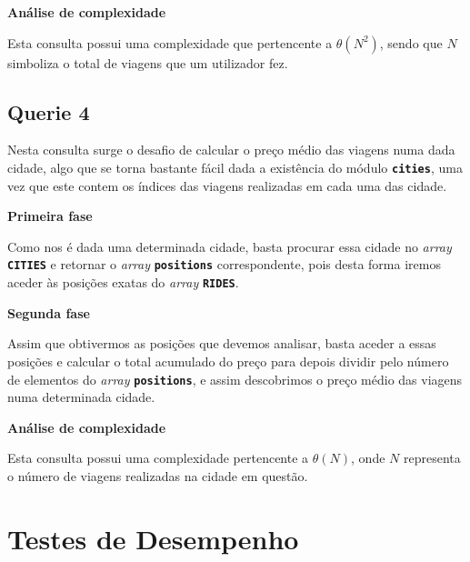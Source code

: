 \documentclass[12pt,a4paper]{report}
\begin{document}
\normalsize\textbf{Análise de complexidade }{\titlerule[0.5pt]}

Esta consulta possui uma complexidade que pertencente a \(\theta(N^2)\), sendo que \(N\) simboliza o total de viagens que um utilizador fez. 


\section{Querie 4}

Nesta consulta surge o desafio de calcular o preço médio das viagens numa dada cidade, algo que se torna bastante fácil dada a existência do módulo \textbf{\small\texttt{cities}}, uma vez que este contem os índices das viagens realizadas em cada uma das cidade.

\normalsize\textbf{Primeira fase }{\titlerule[0.5pt]}

Como nos é dada uma determinada cidade, basta procurar essa cidade no \textit{array} \textbf{\small\texttt{CITIES}} e retornar o \textit{array} \textbf{\small\texttt{positions}} correspondente, pois desta forma iremos aceder às posições exatas do \textit{array} \textbf{\small\texttt{RIDES}}.

\normalsize\textbf{Segunda fase }{\titlerule[0.5pt]}

Assim que obtivermos as posições que devemos analisar, basta aceder a essas posições e calcular o total acumulado do preço para depois dividir pelo número de elementos do \textit{array} \textbf{\small\texttt{positions}}, e assim descobrimos o preço médio das viagens numa determinada cidade.

\normalsize\textbf{Análise de complexidade }{\titlerule[0.5pt]}

Esta consulta possui uma complexidade pertencente a \(\theta(N)\), onde \(N\) representa o número de viagens realizadas na cidade em questão.

\chapter{Testes de Desempenho}
\end{document}
